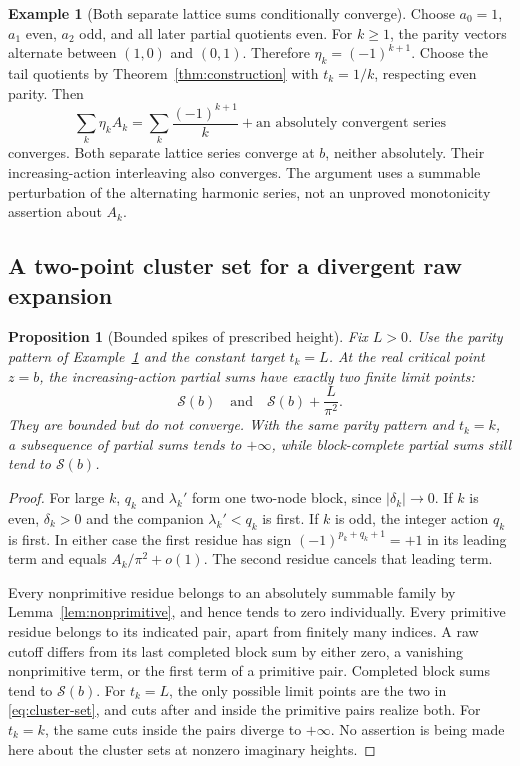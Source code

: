 \documentclass[11pt,a4paper]{article}
\numberwithin{equation}{section}
\newtheorem{proposition}[theorem]{Proposition}
\theoremstyle{definition}
\newtheorem{example}[theorem]{Example}
\theoremstyle{remark}
\newcommand{\Ssum}{\mathcal S}
\begin{document}
\begin{example}[Both separate lattice sums conditionally converge]
\label{ex:separate-conditional}
Choose $a_0=1$, $a_1$ even, $a_2$ odd, and all later partial quotients
even. For $k\ge1$, the parity vectors alternate between $(1,0)$ and
$(0,1)$. Therefore $\eta_k=(-1)^{k+1}$. Choose the tail quotients by
Theorem~\ref{thm:construction} with $t_k=1/k$, respecting even parity.
Then
\[
 \sum_k\eta_k A_k
   =\sum_k\frac{(-1)^{k+1}}{k}
        +\text{an absolutely convergent series}
\]
converges. Both separate lattice series converge at $b$, neither
absolutely. Their increasing-action interleaving also converges.
The argument uses a summable perturbation of the alternating harmonic
series, not an unproved monotonicity assertion about $A_k$.
\end{example}

\subsection{A two-point cluster set for a divergent raw expansion}

\begin{proposition}[Bounded spikes of prescribed height]
\label{prop:spikes}
Fix $L>0$. Use the parity pattern of
Example~\ref{ex:separate-conditional} and the constant target $t_k=L$.
At the real critical point $z=b$, the increasing-action partial sums
have exactly two finite limit points:
\begin{equation}
 \Ssum(b)\quad\text{and}\quad\Ssum(b)+\frac{L}{\pi^2}.
 \label{eq:cluster-set}
\end{equation}
They are bounded but do not converge. With the same parity pattern and
$t_k=k$, a subsequence of partial sums tends to $+\infty$, while
block-complete partial sums still tend to $\Ssum(b)$.
\end{proposition}
\begin{proof}
For large $k$, $q_k$ and $\lambda_k'$ form one two-node block, since
$|\delta_k|\to0$. If $k$ is even, $\delta_k>0$ and the companion
$\lambda_k'<q_k$ is first. If $k$ is odd, the integer action $q_k$ is
first. In either case the first residue has sign
$(-1)^{p_k+q_k+1}=+1$ in its leading term and equals
$A_k/\pi^2+o(1)$. The second residue cancels that leading term.

Every nonprimitive residue belongs to an absolutely summable family
by Lemma~\ref{lem:nonprimitive}, and hence tends to zero individually.
Every primitive residue belongs to its indicated pair, apart from
finitely many indices. A raw cutoff differs from its last completed
block sum by either zero, a vanishing nonprimitive term, or the first
term of a primitive pair. Completed block sums tend to $\Ssum(b)$.
For $t_k=L$, the only possible limit points are the two in
\eqref{eq:cluster-set}, and cuts after and inside the primitive pairs
realize both. For $t_k=k$, the same cuts inside the pairs diverge to
$+\infty$. No assertion is being made here about the cluster sets at
nonzero imaginary heights.
\end{proof}
\end{document}

